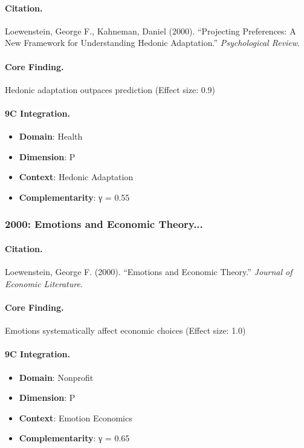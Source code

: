 \paragraph{Citation.}
Loewenstein, George F., Kahneman, Daniel (2000). ``Projecting Preferences: A New Framework for Understanding Hedonic Adaptation.''
\textit{Psychological Review}.

\paragraph{Core Finding.}
Hedonic adaptation outpaces prediction (Effect size: 0.9)

\paragraph{9C Integration.}
\begin{itemize}[nosep]
  \item \textbf{Domain}: Health
  \item \textbf{Dimension}: P
  \item \textbf{Context}: Hedonic Adaptation
  \item \textbf{Complementarity}: γ = 0.55
\end{itemize}

\subsubsection{2000: Emotions and Economic Theory...}

\paragraph{Citation.}
Loewenstein, George F. (2000). ``Emotions and Economic Theory.''
\textit{Journal of Economic Literature}.

\paragraph{Core Finding.}
Emotions systematically affect economic choices (Effect size: 1.0)

\paragraph{9C Integration.}
\begin{itemize}[nosep]
  \item \textbf{Domain}: Nonprofit
  \item \textbf{Dimension}: P
  \item \textbf{Context}: Emotion Economics
  \item \textbf{Complementarity}: γ = 0.65
\end{itemize}

